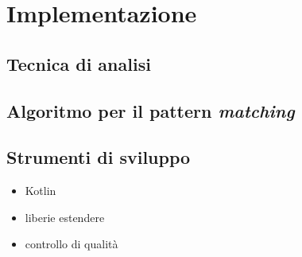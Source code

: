 \chapter{Implementazione}
\label{chapter:implementation}

\section{Tecnica di analisi}

\section{Algoritmo per il pattern \textit{matching}}







\section{Strumenti di sviluppo}

\begin{itemize}
	\item Kotlin
	\item liberie estendere
	\item controllo di qualità
\end{itemize}
